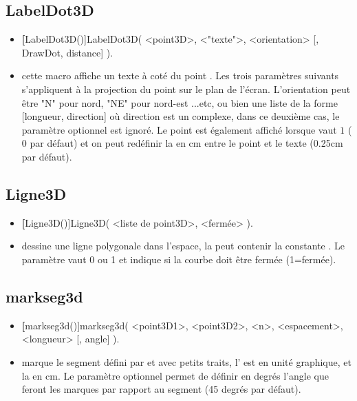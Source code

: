 \subsection{LabelDot3D}
\begin{itemize}
 \item \util \textbf[LabelDot3D()]{LabelDot3D( <point3D>, <"texte">, <orientation> [, DrawDot, distance] )}.
 \item \desc cette macro affiche un texte à coté du point . Les trois paramètres suivants s'appliquent à la projection du point sur le plan de l'écran. L'orientation peut être "N" pour nord, "NE" pour nord-est ...etc, ou bien une liste de la forme [longueur, direction] où direction est un complexe, dans ce deuxième cas, le paramètre optionnel  est ignoré. Le point est également affiché lorsque  vaut $1$ ($0$ par défaut) et on peut redéfinir la  en cm entre le point et le texte (0.25cm par défaut).
\end{itemize}


\subsection{Ligne3D}
\begin{itemize}
 \item \util \textbf[Ligne3D()]{Ligne3D( <liste de point3D>, <fermée> )}.
 \item \desc dessine une ligne polygonale dans l'espace, la  peut contenir la constante \jump. Le paramètre  vaut 0 ou 1 et indique si la courbe doit être fermée (1=fermée).
\end{itemize}

\subsection{markseg3d}
\begin{itemize}
 \item \util \textbf[markseg3d()]{markseg3d( <point3D1>, <point3D2>, <n>, <espacement>, <longueur> [, angle] )}.
 \item \desc marque le segment défini par  et  avec  petits traits, l' est en unité graphique, et la  en cm. Le paramètre optionnel  permet de définir en degrés l'angle que feront les marques par rapport au segment (45 degrés par défaut).
\end{itemize}


